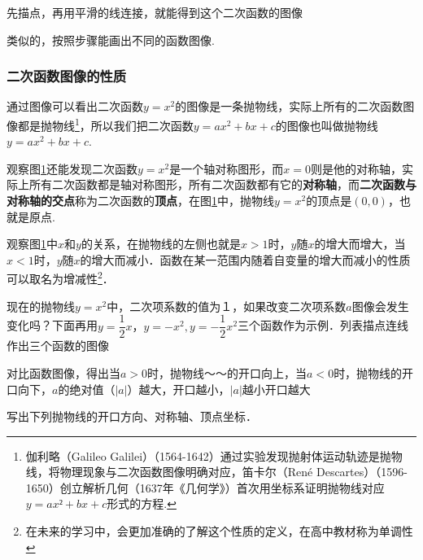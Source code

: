 先描点，再用平滑的线连接，就能得到这个二次函数的图像

\begin{figure}[h]
    \centering
    \caption{}
    \label{fuc_1}
\end{figure}

类似的，按照步骤能画出不同的函数图像.
\par
\subsubsection{二次函数图像的性质}
通过图像可以看出二次函数\(y=x^2\)的图像是一条抛物线，实际上所有的二次函数图像都是抛物线\footnote{伽利略（Galileo Galilei）（1564-1642）通过实验发现抛射体运动轨迹是抛物线，将物理现象与二次函数图像明确对应，笛卡尔（René Descartes）（1596-1650）创立解析几何（1637年《几何学》）首次用坐标系证明抛物线对应\(y=ax²+bx+c\)形式的方程.}，所以我们把二次函数\(y=ax^2+bx+c\)的图像也叫做抛物线\(y=ax^2+bx+c\).
\par
观察图\ref{fuc_1}还能发现二次函数\(y=x^2\)是一个轴对称图形，而\(x=0\)则是他的对称轴，实际上所有二次函数都是轴对称图形，所有二次函数都有它的\textbf{对称轴}，而\textbf{二次函数与对称轴的交点}称为二次函数的\textbf{顶点}，在图\ref{fuc_1}中，抛物线\(y=x^2\)的顶点是\((0,0)\)，也就是原点.
\par
观察图\ref{fuc_1}中\(x\)和\(y\)的关系，在抛物线的左侧也就是\(x>1\)时，\(y\)随\(x\)的增大而增大，当\(x<1\)时，\(y\)随\(x\)的增大而减小．函数在某一范围内随着自变量的增大而减小的性质可以取名为增减性\footnote{在未来的学习中，会更加准确的了解这个性质的定义，在高中教材称为单调性}．
\par
现在的抛物线$y=x^2$中，二次项系数的值为１，如果改变二次项系数$a$图像会发生变化吗？下面再用\(y=\dfrac{1}{2}x，y=-x^2, y=-\dfrac{1}{2}x^2\)三个函数作为示例．列表描点连线作出三个函数的图像
\par
对比函数图像，得出当\(a>0\)时，抛物线～～的开口向上，当$a<0$时，抛物线的开口向下，\(a\)的绝对值（$|a|$）越大，开口越小，$|a|$越小开口越大

\begin{example}
    写出下列抛物线的开口方向、对称轴、顶点坐标．
\end{example}
